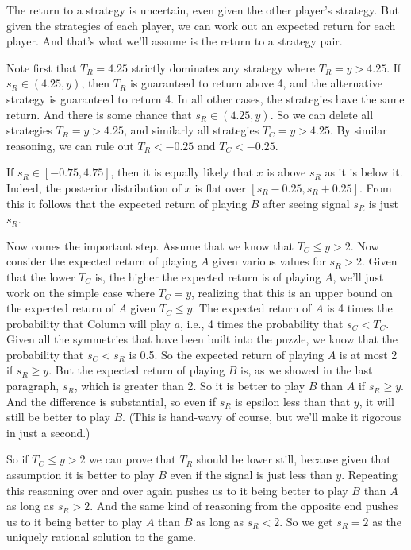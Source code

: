 The return to a strategy is uncertain, even given the other player's strategy. But given the strategies of each player, we can work out an expected return for each player. And that's what we'll assume is the return to a strategy pair.

Note first that $T_R = 4.25$ strictly dominates any strategy where $T_R  = y > 4.25$. If $s_R \in (4.25, y)$, then $T_R$ is guaranteed to return above 4, and the alternative strategy is guaranteed to return 4. In all other cases, the strategies have the same return. And there is some chance that $s_R \in (4.25, y)$. So we can delete all strategies $T_R  = y > 4.25$, and similarly all strategies $T_C = y > 4.25$. By similar reasoning, we can rule out $T_R < -0.25$ and $T_C < -0.25$.

If $s_R \in [-0.75, 4.75]$, then it is equally likely that $x$ is above $s_R$ as it is below it. Indeed, the posterior distribution of $x$ is flat over $[s_R - 0.25, s_R + 0.25]$. From this it follows that the expected return of playing $B$ after seeing signal $s_R$ is just $s_R$.

Now comes the important step. Assume that we know that $T_C \leq y > 2$. Now consider the expected return of playing $A$ given various values for $s_R > 2$. Given that the lower $T_C$ is, the higher the expected return is of playing $A$, we'll just work on the simple case where $T_C = y$, realizing that this is an upper bound on the expected return of $A$ given $T_C \leq y$. The expected return of $A$ is 4 times the probability that Column will play $a$, i.e., 4 times the probability that $s_C < T_C$. Given all the symmetries that have been built into the puzzle, we know that the probability that $s_C < s_R$ is 0.5. So the expected return of playing $A$ is at most 2 if $s_R \geq y$. But the expected return of playing $B$ is, as we showed in the last paragraph, $s_R$, which is greater than 2. So it is better to play $B$ than $A$ if $s_R \geq y$. And the difference is substantial, so even if $s_R$ is epsilon less than that $y$, it will still be better to play $B$. (This is hand-wavy of course, but we'll make it rigorous in just a second.) 

So if $T_C \leq y > 2$ we can prove that $T_R$ should be lower still, because given that assumption it is better to play $B$ even if the signal is just less than $y$. Repeating this reasoning over and over again pushes us to it being better to play $B$ than $A$ as long as $s_R > 2$. And the same kind of reasoning from the opposite end pushes us to it being better to play $A$ than $B$ as long as $s_R < 2$. So we get $s_R = 2$ as the uniquely rational solution to the game.

